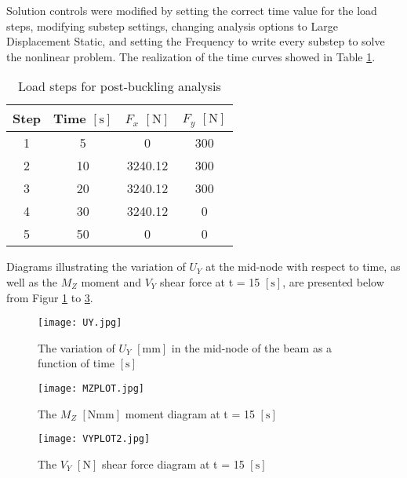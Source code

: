 \documentclass[12pt]{article}
\begin{document}
\noindent Solution controls were modified by setting the correct time value for the load steps, modifying substep settings, changing analysis options to Large Displacement Static, and setting the Frequency to write every substep to solve the nonlinear problem. The realization of the time curves showed in Table \ref{tab:loadsteps}.

\pagebreak

\begin{table}[h]
\centering
\caption{Load steps for post-buckling analysis}
\label{tab:loadsteps}
\begin{tabular}{cccc}
Step & Time $\left[ \text{s} \right]$ & $F_x$ $\left[ \text{N} \right]$ & $F_y$ $\left[ \text{N} \right]$ \\
\hline
1 & 5 & 0 & 300 \\
2 & 10 & 3240.12 & 300 \\
3 & 20 & 3240.12 & 300 \\
4 & 30 & 3240.12 & 0 \\
5 & 50 & 0 & 0 \\
\end{tabular}

\end{table}

Diagrams illustrating the variation of $U_Y$ at the mid-node with respect to time, as well as the $M_Z$ moment and $V_Y$ shear force at t = 15 $\left[ \text{s} \right]$, are presented below from Figur \ref{fig:uy} to \ref{fig:vy}.

\begin{figure}[h!]
\centering
\texttt{[image: UY.jpg]}
\caption{The variation of $U_Y$  $\left[ \text{mm} \right]$ in the mid-node of the beam as a function of time $\left[ \text{s} \right]$}
\label{fig:uy}
\end{figure}

\begin{figure}[h!]
\centering
\texttt{[image: MZPLOT.jpg]}
\caption{The $M_Z$ $\left[ \text{Nmm} \right]$ moment diagram at t = 15 $\left[ \text{s} \right]$}
\label{fig:mz}
\end{figure}

\begin{figure}[h!]
\centering
\texttt{[image: VYPLOT2.jpg]}
\caption{The $V_Y$ $\left[ \text{N} \right]$ shear force diagram at t = 15 $\left[ \text{s} \right]$}
\label{fig:vy}
\end{figure}
\end{document}
